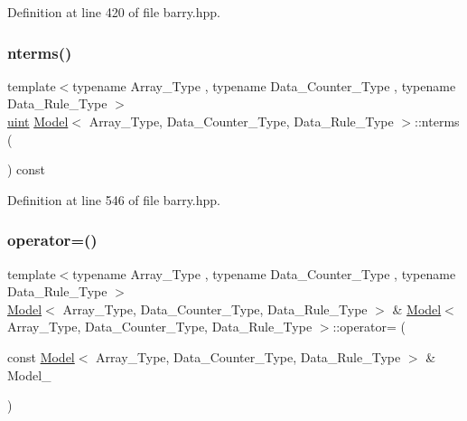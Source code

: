 Definition at line 420 of file barry.\+hpp.

\mbox{\label{classbarry_1_1_model_ad2a8b05a7d53289a8fc2e315739acdf9}} 
\subsubsection{\texorpdfstring{nterms()}{nterms()}}
{\footnotesize\ttfamily template$<$typename Array\+\_\+\+Type , typename Data\+\_\+\+Counter\+\_\+\+Type , typename Data\+\_\+\+Rule\+\_\+\+Type $>$ \\
\hyperlink{namespacebarry_a11dfc53ddb4672278319aa04f1e09a6c}{uint} \hyperlink{classbarry_1_1_model}{Model}$<$ Array\+\_\+\+Type, Data\+\_\+\+Counter\+\_\+\+Type, Data\+\_\+\+Rule\+\_\+\+Type $>$\+::nterms (\begin{DoxyParamCaption}{ }\end{DoxyParamCaption}) const\hspace{0.3cm}{\ttfamily [inline]}}



Definition at line 546 of file barry.\+hpp.

\mbox{\label{classbarry_1_1_model_a4944b5918dc4a9a59f72587da1e6bb3a}} 
\subsubsection{\texorpdfstring{operator=()}{operator=()}}
{\footnotesize\ttfamily template$<$typename Array\+\_\+\+Type , typename Data\+\_\+\+Counter\+\_\+\+Type , typename Data\+\_\+\+Rule\+\_\+\+Type $>$ \\
\hyperlink{classbarry_1_1_model}{Model}$<$ Array\+\_\+\+Type, Data\+\_\+\+Counter\+\_\+\+Type, Data\+\_\+\+Rule\+\_\+\+Type $>$ \& \hyperlink{classbarry_1_1_model}{Model}$<$ Array\+\_\+\+Type, Data\+\_\+\+Counter\+\_\+\+Type, Data\+\_\+\+Rule\+\_\+\+Type $>$\+::operator= (\begin{DoxyParamCaption}\item[{const \hyperlink{classbarry_1_1_model}{Model}$<$ Array\+\_\+\+Type, Data\+\_\+\+Counter\+\_\+\+Type, Data\+\_\+\+Rule\+\_\+\+Type $>$ \&}]{Model\+\_\+ }\end{DoxyParamCaption})\hspace{0.3cm}{\ttfamily [inline]}}




